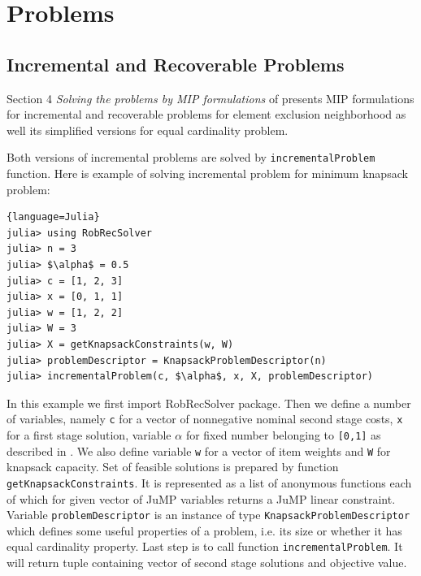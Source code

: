 \section{Problems}
\subsection{Incremental and Recoverable Problems}
Section 4 \textit{Solving the problems by MIP formulations} of \cite{DBLP:journals/corr/abs-1811-06719} presents MIP formulations for incremental and recoverable problems for element exclusion neighborhood as well its simplified versions for equal cardinality problem.

Both versions of incremental problems are solved by \texttt{incrementalProblem} function. Here is example of solving incremental problem for minimum knapsack problem:
\begin{lstlisting}[mathescape]{language=Julia}
julia> using RobRecSolver
julia> n = 3
julia> $\alpha$ = 0.5
julia> c = [1, 2, 3]
julia> x = [0, 1, 1]
julia> w = [1, 2, 2]
julia> W = 3
julia> X = getKnapsackConstraints(w, W)
julia> problemDescriptor = KnapsackProblemDescriptor(n)
julia> incrementalProblem(c, $\alpha$, x, X, problemDescriptor)
\end{lstlisting}
In this example we first import RobRecSolver package. Then we define a number of variables, namely \texttt{c} for a vector of nonnegative nominal second stage costs, \texttt{x} for a first stage solution, variable \texttt{$\alpha$} for fixed number belonging to \texttt{[0,1]} as described in \cite{DBLP:journals/corr/abs-1811-06719}. We also define variable \texttt{w} for a vector of item weights and \texttt{W} for knapsack capacity. Set of feasible solutions is prepared by function \texttt{getKnapsackConstraints}. It is represented as a list of anonymous functions each of which for given vector of JuMP variables returns a JuMP linear constraint. Variable \texttt{problemDescriptor} is an instance of type \texttt{KnapsackProblemDescriptor} which defines some useful properties of a problem, i.e. its size or whether it has equal cardinality property. Last step is to call function \texttt{incrementalProblem}. It will return tuple containing vector of second stage solutions and objective value.


